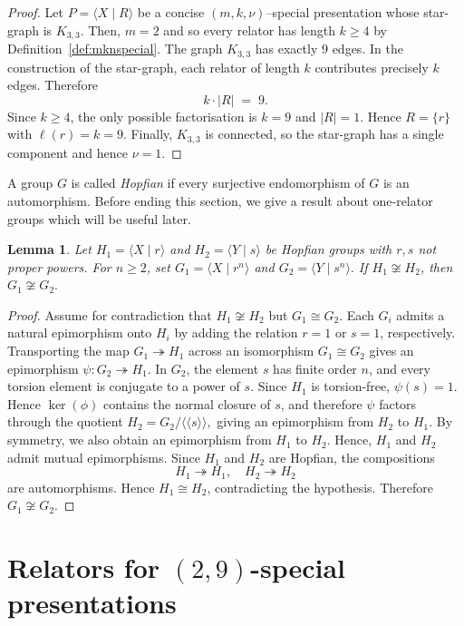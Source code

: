 \documentclass[a4paper,12pt,oneside]{article}
\newtheorem{lem}[theorem]{Lemma}
\begin{document}
\begin{proof}
Let $P=\langle X \mid R\rangle$ be a concise $(m,k,\nu)$–special presentation whose star-graph is $K_{3,3}$. Then, $m=2$ and so every relator has length $k\ge4$ by Definition~\ref{def:mknspecial}.  The graph $K_{3,3}$ has  exactly $9$ edges. In the construction of the star-graph, each relator of length $k$ contributes precisely $k$ edges. Therefore
\[
k \cdot |R| \;=\; 9.
\]
Since $k\ge4$, the only possible factorisation is $k=9$ and $|R|=1$. Hence $R=\{r\}$ with $\ell(r)=k=9$.  Finally, $K_{3,3}$ is connected, so the star-graph has a single component and hence $\nu=1$.
\end{proof}
A group $G$ is called \emph{Hopfian} if every surjective endomorphism of $G$ is an automorphism. Before ending this section, we give a result about one-relator groups which will be useful later.
\begin{lem}\label{hopf}
Let
\(
H_1=\langle X \mid r\rangle\) and \(H_2=\langle Y \mid s\rangle
\) be
Hopfian groups with $r,s$ not proper powers. For $n\ge2$, set
\(
G_1=\langle X \mid r^n\rangle\) and \(G_2=\langle Y \mid s^n\rangle.
\)
If $H_1 \not\cong H_2$, then
\(
G_1 \not\cong G_2.
\)
\end{lem}
\begin{proof}
Assume for contradiction that $H_1 \not\cong H_2$ but $G_1 \cong G_2$. Each $G_i$ admits a natural epimorphism onto $H_i$ by adding the relation $r=1$ or $s=1$, respectively. Transporting the map $G_1 \twoheadrightarrow H_1$ across an isomorphism $G_1 \cong G_2$ gives an epimorphism
\(
\psi: G_2 \twoheadrightarrow H_1.
\)
In $G_2$, the element $s$ has finite order $n$, and every torsion element is conjugate to a power of $s$. Since $H_1$ is torsion-free, $\psi(s)=1$. Hence $\ker(\phi)$ contains the normal closure of $s$, and therefore $\psi$ factors through the quotient
\(
H_2 = G_2/\!\langle\!\langle s\rangle\!\rangle,
\)
giving an epimorphism from $H_2$ to  $H_1$. By symmetry, we also obtain an epimorphism from $H_1$ to  $H_2$. Hence, $H_1$ and $H_2$ admit mutual epimorphisms. Since $H_1$ and $H_2$ are Hopfian, the compositions
\[
H_1 \twoheadrightarrow H_1,\quad H_2 \twoheadrightarrow H_2
\]
are automorphisms. Hence $H_1 \cong H_2$, contradicting the hypothesis. Therefore $G_1 \not\cong G_2$.
\end{proof}

\section{Relators for \texorpdfstring{$(2,9)$}{(2,9)}-special presentations}\label{sec:enumeration}
\end{document}
